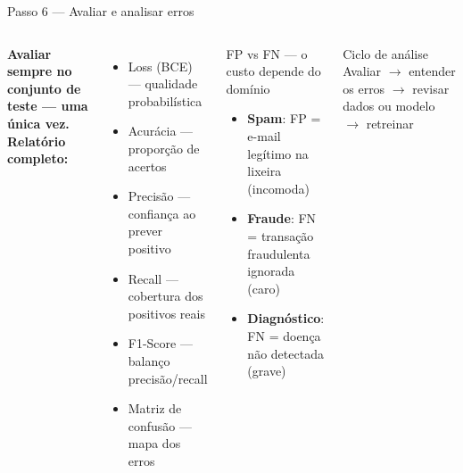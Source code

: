 \documentclass[aspectratio=169]{beamer}
\begin{document}
\begin{frame}{Passo 6 — Avaliar e analisar erros}
\begin{columns}
\textbf{Avaliar sempre no conjunto de teste — uma única vez.}\\[6pt]
\textbf{Relatório completo:}
\begin{itemize}
  \item Loss (BCE) — qualidade probabilística
  \item Acurácia — proporção de acertos
  \item Precisão — confiança ao prever positivo
  \item Recall — cobertura dos positivos reais
  \item F1-Score — balanço precisão/recall
  \item Matriz de confusão — mapa dos erros
\end{itemize}
\begin{block}{FP vs FN — o custo depende do domínio}
  \begin{itemize}
    \item \textbf{Spam}: FP = e-mail legítimo na lixeira (incomoda)
    \item \textbf{Fraude}: FN = transação fraudulenta ignorada (caro)
    \item \textbf{Diagnóstico}: FN = doença não detectada (grave)
  \end{itemize}
\end{block}
\vspace{4pt}
\begin{alertblock}{Ciclo de análise}
  Avaliar $\to$ entender os erros $\to$ revisar dados ou modelo $\to$ retreinar
\end{alertblock}
\end{columns}
\end{frame}
\end{document}
